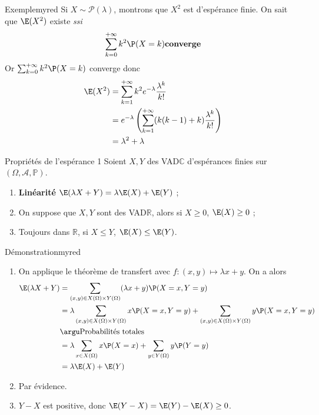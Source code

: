     \begin{omed}{Exemple}{myred}
        Si $X \sim \mathcal{P}(\lambda)$, montrons que $X^2$ est d’espérance finie. On sait que $\E(X^2)$ existe \textit{ssi}
        \[ \sum_{k=0}^{+\infty} k^2 \P(X = k) \textbf{converge}\]  
        Or $\sum_{k=0}^{+\infty} k^2 \P(X = k)$ converge donc 
        \begin{align*}
            \E(X^2) &= \sum_{k=1}^{+\infty} k^2 e^{-\lambda} \frac{\lambda^k}{k!} \\
            &= e^{-\lambda} \left(\sum_{k = 1}^{+\infty} (k(k-1) + k) \frac{\lambda^k}{k!}\right) \\
            &= \lambda^2 + \lambda
        \end{align*}
    \end{omed}

    \begin{theo}{Propriétés de l’espérance 1}{}
        Soient $X,Y$ des VAD$\mathbb{C}$ d’espérances finies sur $(\Omega, \mathcal{A}, \mathbb{P})$. 
        \begin{enumerate}
            \item \textbf{Linéarité} \quad $\E(\lambda X + Y) = \lambda \E(X) + \E(Y)$ ;
            \item On suppose que $X,Y$ sont des VAD$\mathbb{R}$, alors si $X \geq 0$, $\E(X) \geq 0$ ;
            \item Toujours dans $\mathbb{R}$, si $X \leq Y$, $\E(X) \leq \E(Y)$.
        \end{enumerate}
    \end{theo}

    \begin{demo}{Démonstration}{myred}
        \begin{enumerate}
            \item On applique le théorème de transfert avec $f : (x,y) \mapsto \lambda x + y$. On a alors 
            \begin{align*}
                \E(\lambda X + Y) 
                &= \sum_{(x,y) \in X(\Omega) \times Y(\Omega)} (\lambda x + y) \P(X = x, Y = y) \\
                &= \lambda \sum_{(x,y) \in X(\Omega) \times Y(\Omega)} x \P(X=x,Y=y) + \sum_{(x,y) \in X(\Omega) \times Y(\Omega)} y \P(X=x,Y=y) \\
                &\argu \text{Probabilités totales} \\
                &= \lambda \sum_{x \in X(\Omega)} x \P(X=x) + \sum_{y \in Y(\Omega)} y \P(Y=y) \\
                &= \lambda \E(X) + \E(Y) 
            \end{align*}
            \item Par évidence.
            \item $Y - X$ est positive, donc $\E(Y-X) = \E(Y ) - \E(X) \geq 0$.
        \end{enumerate}
    \end{demo}

